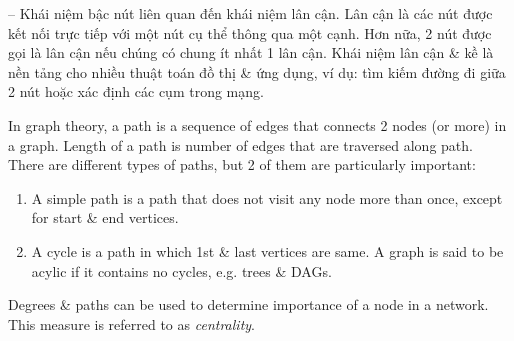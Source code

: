 \documentclass{article}
\begin{document}
\begin{itemize}
\begin{itemize}
\begin{itemize}
            -- Khái niệm bậc nút liên quan đến khái niệm lân cận. Lân cận là các nút được kết nối trực tiếp với một nút cụ thể thông qua một cạnh. Hơn nữa, 2 nút được gọi là lân cận nếu chúng có chung ít nhất 1 lân cận. Khái niệm lân cận \& kề là nền tảng cho nhiều thuật toán đồ thị \& ứng dụng, ví dụ: tìm kiếm đường đi giữa 2 nút hoặc xác định các cụm trong mạng.

            In graph theory, a path is a sequence of edges that connects 2 nodes (or more) in a graph. Length of a path is number of edges that are traversed along path. There are different types of paths, but 2 of them are particularly important:
            \begin{enumerate}
                \item A simple path is a path that does not visit any node more than once, except for start \& end vertices.
                \item A cycle is a path in which 1st \& last vertices are same. A graph is said to be acylic if it contains no cycles, e.g. trees \& DAGs.
            \end{enumerate}
            Degrees \& paths can be used to determine importance of a node in a network. This measure is referred to as {\it centrality}.


\end{itemize}
\end{itemize}
\end{itemize}
\end{document}
